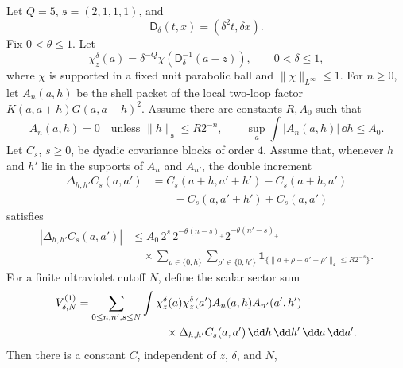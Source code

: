 \begin{proposition}
\label{prop:spde-x2y-first-chaos-logarithmic-scale-bound}
Let \(Q=5\), \(\mathfrak s=(2,1,1,1)\), and
\[
  \mathsf D_\delta(t,x)=(\delta^2t,\delta x).
\]
Fix \(0<\theta\leq1\).  Let
\[
  \chi_z^\delta(a)
  =
  \delta^{-Q}\chi(\mathsf D_\delta^{-1}(a-z)),
  \qquad
  0<\delta\leq1,
\]
where \(\chi\) is supported in a fixed unit parabolic ball and
\(\|\chi\|_{L^\infty}\leq1\).  For \(n\geq0\), let \(A_n(a,h)\) be the
shell packet of the local two-loop factor \(K(a,a+h)G(a,a+h)^2\).  Assume
there are constants \(R,A_0\) such that
\begin{equation}
  A_n(a,h)=0\quad\text{unless }\|h\|_{\mathfrak s}\leq R2^{-n},
  \qquad
  \sup_a\int |A_n(a,h)|\,\dd h\leq A_0 .
  \label{eq:spde-local-two-loop-shell-lone-bound}
\end{equation}
Let \(C_s\), \(s\geq0\), be dyadic covariance blocks of order \(4\).  Assume
that, whenever \(h\) and \(h'\) lie in the supports of \(A_n\) and
\(A_{n'}\), the double increment
\[
\begin{aligned}
  \Delta_{h,h'}C_s(a,a')
  &=
  C_s(a+h,a'+h')-C_s(a+h,a')\\
  &\qquad
  -C_s(a,a'+h')+C_s(a,a')
\end{aligned}
\]
satisfies
\begin{equation}
\begin{aligned}
  |\Delta_{h,h'}C_s(a,a')|
  &\leq
  A_0\,2^s\,
  2^{-\theta(n-s)_+}
  2^{-\theta(n'-s)_+}                                   \\
  &\quad\times
  \sum_{\rho\in\{0,h\}}\sum_{\rho'\in\{0,h'\}}
  \mathbf 1_{\{\|a+\rho-a'-\rho'\|_{\mathfrak s}\leq R2^{-s}\}} .
\end{aligned}
  \label{eq:spde-covariance-block-double-increment-bound}
\end{equation}
For a finite ultraviolet cutoff \(N\), define the scalar sector sum
\begin{equation}
\begin{aligned}
  V_{\delta,N}^{(1)}
  &=
  \sum_{0\leq n,n',s\leq N}
  \int
  \chi_z^\delta(a)\chi_z^\delta(a')A_n(a,h)A_{n'}(a',h')\\
  &\hspace{8.0em}\times
  \Delta_{h,h'}C_s(a,a')\,
  \dd h\,\dd h'\,\dd a\,\dd a' .
\end{aligned}
  \label{eq:spde-first-chaos-sector-sum}
\end{equation}
Then there is a constant \(C\), independent of \(z\), \(\delta\), and \(N\),

\end{proposition}
